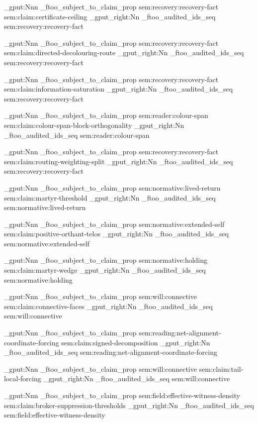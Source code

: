 \prop_gput:Nnn \g_ftoo_subject_to_claim_prop { sem:recovery:recovery-fact } { sem:claim:certificate-ceiling }
\seq_gput_right:Nn \g_ftoo_audited_ids_seq { sem:recovery:recovery-fact }

\prop_gput:Nnn \g_ftoo_subject_to_claim_prop { sem:recovery:recovery-fact } { sem:claim:directed-decolouring-route }
\seq_gput_right:Nn \g_ftoo_audited_ids_seq { sem:recovery:recovery-fact }

\prop_gput:Nnn \g_ftoo_subject_to_claim_prop { sem:recovery:recovery-fact } { sem:claim:information-saturation }
\seq_gput_right:Nn \g_ftoo_audited_ids_seq { sem:recovery:recovery-fact }

\prop_gput:Nnn \g_ftoo_subject_to_claim_prop { sem:reader:colour-span } { sem:claim:colour-span-block-orthogonality }
\seq_gput_right:Nn \g_ftoo_audited_ids_seq { sem:reader:colour-span }

\prop_gput:Nnn \g_ftoo_subject_to_claim_prop { sem:recovery:recovery-fact } { sem:claim:routing-weighting-split }
\seq_gput_right:Nn \g_ftoo_audited_ids_seq { sem:recovery:recovery-fact }

\prop_gput:Nnn \g_ftoo_subject_to_claim_prop { sem:normative:lived-return } { sem:claim:martyr-threshold }
\seq_gput_right:Nn \g_ftoo_audited_ids_seq { sem:normative:lived-return }

\prop_gput:Nnn \g_ftoo_subject_to_claim_prop { sem:normative:extended-self } { sem:claim:positive-orthant-telos }
\seq_gput_right:Nn \g_ftoo_audited_ids_seq { sem:normative:extended-self }

\prop_gput:Nnn \g_ftoo_subject_to_claim_prop { sem:normative:holding } { sem:claim:martyr-wedge }
\seq_gput_right:Nn \g_ftoo_audited_ids_seq { sem:normative:holding }

\prop_gput:Nnn \g_ftoo_subject_to_claim_prop { sem:will:connective } { sem:claim:connective-faces }
\seq_gput_right:Nn \g_ftoo_audited_ids_seq { sem:will:connective }

\prop_gput:Nnn \g_ftoo_subject_to_claim_prop { sem:reading:net-alignment-coordinate-forcing } { sem:claim:signed-decomposition }
\seq_gput_right:Nn \g_ftoo_audited_ids_seq { sem:reading:net-alignment-coordinate-forcing }

\prop_gput:Nnn \g_ftoo_subject_to_claim_prop { sem:will:connective } { sem:claim:tail-local-forcing }
\seq_gput_right:Nn \g_ftoo_audited_ids_seq { sem:will:connective }

\prop_gput:Nnn \g_ftoo_subject_to_claim_prop { sem:field:effective-witness-density } { sem:claim:broker-suppression-thresholds }
\seq_gput_right:Nn \g_ftoo_audited_ids_seq { sem:field:effective-witness-density }

